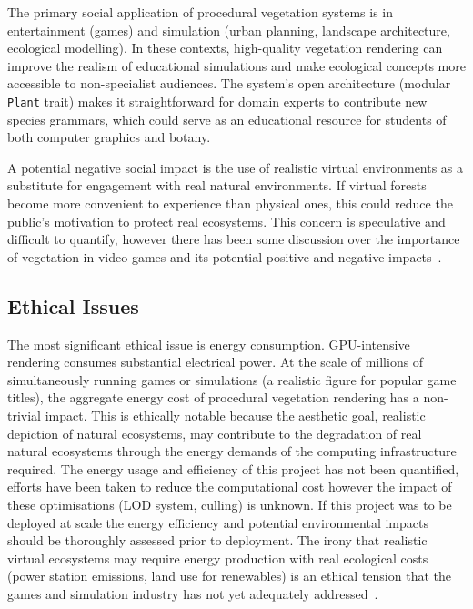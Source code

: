 \begin{appendices}
The primary social application of procedural vegetation systems is in entertainment (games) and simulation
(urban planning, landscape architecture, ecological modelling). In these contexts, high-quality vegetation
rendering can improve the realism of educational simulations and make ecological concepts more accessible to
non-specialist audiences. The system's open architecture (modular \texttt{Plant} trait) makes it
straightforward for domain experts to contribute new species grammars, which could serve as an educational
resource for students of both computer graphics and botany.

\medskip
A potential negative social impact is the use of realistic virtual environments as a substitute for
engagement with real natural environments. If virtual forests become more convenient to experience than
physical ones, this could reduce the public's motivation to protect real ecosystems. This concern is
speculative and difficult to quantify, however there has been some discussion over the importance of
vegetation in video games and its potential positive and negative impacts~\cite{truongGamersItGreen2018}.

\subsection{Ethical Issues}

The most significant ethical issue is energy consumption. GPU-intensive rendering consumes substantial
electrical power. At the scale of millions of simultaneously running games or simulations (a realistic figure
for popular game titles), the aggregate energy cost of procedural vegetation rendering has a non-trivial
impact. This is ethically notable because the aesthetic goal, realistic depiction of natural ecosystems, may
contribute to the degradation of real natural ecosystems through the energy demands of the computing
infrastructure required. The energy usage and efficiency of this project has not been quantified, efforts
have been taken to reduce the computational cost however the impact of these optimisations (LOD system,
culling) is unknown. If this project was to be deployed at scale the energy efficiency and potential
environmental impacts should be thoroughly assessed prior to deployment. The irony that realistic virtual
ecosystems may require energy production with real ecological costs (power station emissions, land use for
renewables) is an ethical tension that the games and simulation industry has not yet adequately
addressed~\cite{truongGamersItGreen2018,changGreenComputerVideo}.


\end{appendices}
